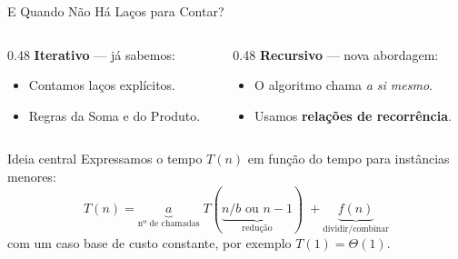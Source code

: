 \documentclass[aspectratio=169]{beamer}
\begin{document}
\begin{frame}{E Quando Não Há Laços para Contar?}
  \begin{columns}[T]
    \begin{column}{0.48\textwidth}
      \textbf{Iterativo} --- já sabemos:
      \begin{itemize}
        \item Contamos laços explícitos.
        \item Regras da Soma e do Produto.
      \end{itemize}
    \end{column}
    \begin{column}{0.48\textwidth}
      \textbf{Recursivo} --- nova abordagem:
      \begin{itemize}
        \item O algoritmo chama \emph{a si mesmo}.
        \item Usamos \textbf{relações de recorrência}.
      \end{itemize}
    \end{column}
  \end{columns}

  \vspace{0.5cm}
  \begin{block}{Ideia central}
    Expressamos o tempo $T(n)$ em função do tempo para instâncias menores:
    \[
      T(n) = \underbrace{a}_{\text{nº de chamadas}} \; T(\underbrace{n/b \text{ ou } n-1}_{\text{redução}}) \; + \underbrace{f(n)}_{\text{dividir/combinar}}
    \]
    com um caso base de custo constante, por exemplo $T(1) = \Theta(1)$.
  \end{block}
\end{frame}
\end{document}
